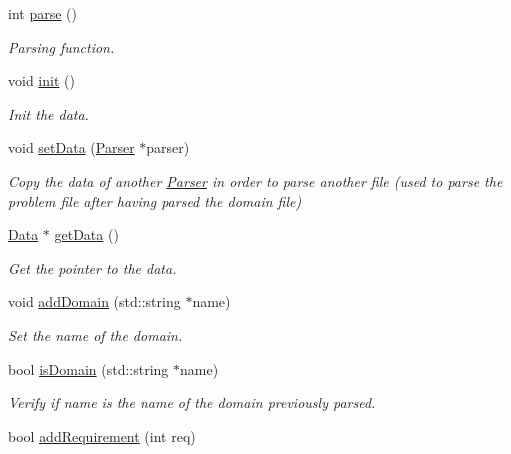 \begin{DoxyCompactItemize}
\item 
int \hyperlink{classParser_af677db3c393c6b50d839290ad1af7d1d}{parse} ()
\begin{DoxyCompactList}\small\item\em Parsing function. \end{DoxyCompactList}\item 
\hypertarget{classParser_abdc68932f658c4a203aa97ab368f0d2b}{void \hyperlink{classParser_abdc68932f658c4a203aa97ab368f0d2b}{init} ()}\label{classParser_abdc68932f658c4a203aa97ab368f0d2b}

\begin{DoxyCompactList}\small\item\em Init the data. \end{DoxyCompactList}\item 
void \hyperlink{classParser_a280a5db9d433fd9a5d90aed3ec240a41}{set\+Data} (\hyperlink{classParser}{Parser} $\ast$parser)
\begin{DoxyCompactList}\small\item\em Copy the data of another \hyperlink{classParser}{Parser} in order to parse another file (used to parse the problem file after having parsed the domain file) \end{DoxyCompactList}\item 
\hyperlink{classData}{Data} $\ast$ \hyperlink{classParser_a6202bf4573fd50d5e052640177ca2289}{get\+Data} ()
\begin{DoxyCompactList}\small\item\em Get the pointer to the data. \end{DoxyCompactList}\item 
void \hyperlink{classParser_abd319a3d809d96b35da0b07160080ff1}{add\+Domain} (std\+::string $\ast$name)
\begin{DoxyCompactList}\small\item\em Set the name of the domain. \end{DoxyCompactList}\item 
bool \hyperlink{classParser_ae97c849415a4b6943b45d2e314a89795}{is\+Domain} (std\+::string $\ast$name)
\begin{DoxyCompactList}\small\item\em Verify if name is the name of the domain previously parsed. \end{DoxyCompactList}\item 
bool \hyperlink{classParser_a16caa057293d617e95e374ec3101c023}{add\+Requirement} (int req)

\end{DoxyCompactItemize}
